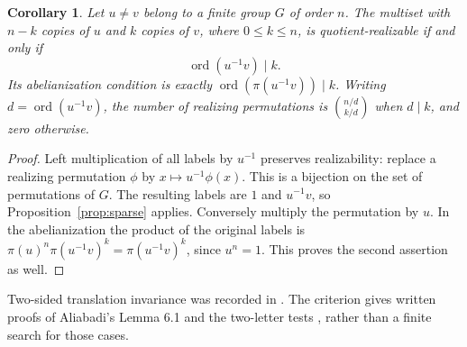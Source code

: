 \documentclass[11pt]{article}
\newtheorem{corollary}[theorem]{Corollary}
\begin{document}
\begin{corollary}\label{cor:twoletter}
Let $u\ne v$ belong to a finite group $G$ of order $n$.
The multiset with $n-k$ copies of $u$ and $k$ copies of $v$, where
$0\leq k\leq n$, is quotient-realizable if and only if
\[
 \operatorname{ord}(u^{-1}v)\mid k.
\]
Its abelianization condition is exactly
$\operatorname{ord}(\pi(u^{-1}v))\mid k$.
Writing $d=\operatorname{ord}(u^{-1}v)$, the number of realizing
permutations is $\binom{n/d}{k/d}$ when $d\mid k$, and zero otherwise.
\end{corollary}
\begin{proof}
Left multiplication of all labels by $u^{-1}$ preserves realizability:
replace a realizing permutation $\phi$ by $x\mapsto u^{-1}\phi(x)$.
This is a bijection on the set of permutations of $G$.
The resulting labels are $1$ and $u^{-1}v$, so
Proposition~\ref{prop:sparse} applies. Conversely multiply the permutation
by $u$. In the abelianization the product of the original labels is
$\pi(u)^n\pi(u^{-1}v)^k=\pi(u^{-1}v)^k$, since $u^n=1$.
This proves the second assertion as well.
\end{proof}
Two-sided translation invariance was recorded in
\cite[Proposition 2.4]{KSL}. The criterion gives written proofs of
Aliabadi's Lemma 6.1 and the two-letter tests
\cite[Theorems 5.4 and 6.4]{KSL}, rather than a finite search for those cases.
\end{document}
